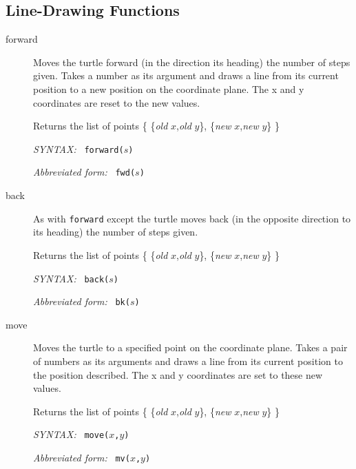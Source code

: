 \documentclass[11pt]{article}
\newcommand{\syntax}{\textsl{SYNTAX: }}
\newcommand{\abb}{\textsl{Abbreviated form: }}
\begin{document}
\subsection{Line-Drawing Functions}
\begin{description}
 \item[forward] Moves the turtle forward (in the direction its heading)
       the number of steps given. Takes a number as its argument and draws
       a line from its current position to a new position on the
       coordinate plane. The x and y coordinates are reset to the new
       values.

       Returns the list of points  
    \{ \{{\it old} $x$,{\it old} $y$\}, \{{\it new} $x$,{\it new} $y$\} \}

       \syntax\ {\tt forward($s$)}
 
       \abb\ {\tt fwd($s$)}
 \item[back] As with {\tt forward} except the turtle moves back (in the
       opposite direction to its heading) the number of steps given.

       Returns the list of points
    \{ \{{\it old} $x$,{\it old} $y$\}, \{{\it new} $x$,{\it new} $y$\} \}

       \syntax\ {\tt back($s$)}

       \abb\ {\tt bk($s$)}
 \item[move] Moves the turtle to a specified point on the coordinate
       plane. Takes a pair of numbers as its arguments and draws a line
       from its current position to the position described. The x and y
       coordinates are set to these new values.

       Returns the list of points 
    \{ \{{\it old} $x$,{\it old} $y$\}, \{{\it new} $x$,{\it new} $y$\} \}

       \syntax\ {\tt move($x$,$y$)}

       \abb\ {\tt mv($x$,$y$)}
\end{description}
\end{document}
